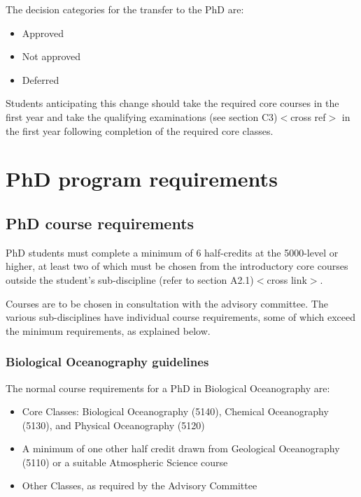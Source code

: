 \documentclass{article}
\newcommand{\fixme}[1]{\color{red}$<$#1$>$\color{black}\index{$>>>>$FIXME$<<<<$}}
\begin{document}
The decision categories for the transfer to the PhD are:
\begin{itemize}
\item Approved
\item Not approved
\item Deferred
\end{itemize}

Students anticipating this change should take the required core courses in the
first year and take the qualifying examinations (see section C3)\fixme{cross
ref} in the first year following completion of the required core classes.

\section{PhD program requirements}

\subsection{PhD course requirements}

PhD students must complete a minimum of 6 half-credits at the 5000-level or
higher, at least two of which must be chosen from the introductory core courses
outside the student’s sub-discipline (refer to section A2.1)\fixme{cross link}.

Courses are to be chosen in consultation with the advisory committee. The
various sub-disciplines have individual course requirements, some of which
exceed the minimum requirements, as explained below.

\subsubsection{Biological Oceanography guidelines}

The normal course requirements for a PhD in Biological Oceanography are:
\begin{itemize}
\item Core Classes: Biological Oceanography (5140), Chemical Oceanography (5130), and Physical Oceanography (5120)
\item A minimum of one other half credit drawn from Geological Oceanography (5110) or a suitable Atmospheric Science course
\item Other Classes, as required by the Advisory Committee
\end{itemize}
\end{document}
